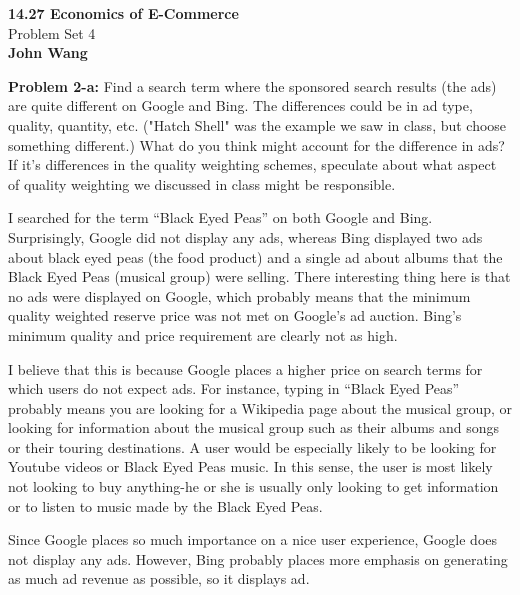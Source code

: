 \documentclass[psamsfonts]{amsart}
\newenvironment{sol}{\vspace{0.25cm}{\large \bfseries Solution:}}{\qedsymbol}
\newenvironment{prob}[1]{\begin{framed}{\large \bfseries Problem #1:}}{\end{framed}}
\newcommand{\makenewtitle}{
    \begin{center}
    {\huge \bfseries 14.27 Economics of E-Commerce} \\
    Problem Set 4\\
    \vspace{0.25cm}
    {\bfseries John Wang} 
    \end{center}
    \vspace{0.5cm}
}
\begin{document}
\makenewtitle

\begin{prob}{2-a}
Find a search term where the sponsored search results (the ads) are quite different on Google and Bing.  The differences could be in ad type, quality, quantity, etc.  ("Hatch Shell" was the example we saw in class, but choose something different.)  What do you think might account for the difference in ads?  If it's differences in the quality weighting schemes, speculate about what aspect of quality weighting we discussed in class might be responsible.
\end{prob}

\begin{sol}
I searched for the term ``Black Eyed Peas'' on both Google and Bing. Surprisingly, Google did not display any ads, whereas Bing displayed two ads about black eyed peas (the food product) and a single ad about albums that the Black Eyed Peas (musical group) were selling. There interesting thing here is that no ads were displayed on Google, which probably means that the minimum quality weighted reserve price was not met on Google's ad auction. Bing's minimum quality and price requirement are clearly not as high. 

I believe that this is because Google places a higher price on search terms for which users do not expect ads. For instance, typing in ``Black Eyed Peas'' probably means you are looking for a Wikipedia page about the musical group, or looking for information about the musical group such as their albums and songs or their touring destinations. A user would be especially likely to be looking for Youtube videos or Black Eyed Peas music. In this sense, the user is most likely not looking to buy anything-he or she is usually only looking to get information or to listen to music made by the Black Eyed Peas.

Since Google places so much importance on a nice user experience, Google does not display any ads. However, Bing probably places more emphasis on generating as much ad revenue as possible, so it displays ad.
\end{sol}
\end{document}
